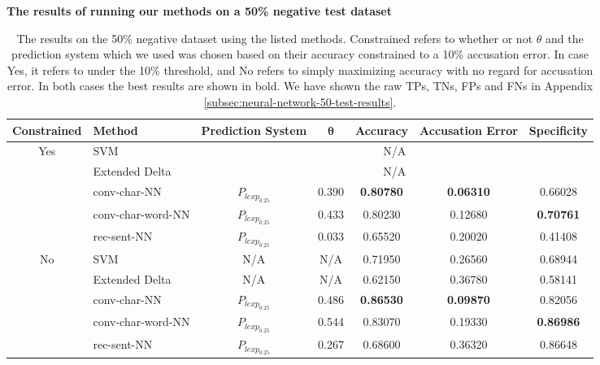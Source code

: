 \begin{table}[]
\centering
\textbf{The results of running our methods on a 50\% negative test dataset}\par\medskip
\begin{adjustbox}{center}
\scriptsize
\begin{tabular}{|c|l|c|c|c|c|c|}
\hline
    \textbf{Constrained} & \textbf{Method} & \textbf{Prediction System} & $\mathbf{\theta}$ & \textbf{Accuracy} & \textbf{Accusation Error} & \textbf{Specificity} \\ \hline
    \multirow{5}{*}{Yes} & \gls{SVM} & \multicolumn{5}{c|}{N/A} \\ \cline{2-7}
    & Extended Delta & \multicolumn{5}{c|}{N/A} \\ \cline{2-7}
    & \gls{conv-char-NN} & $P_{lexp_{0.25}}$ & 0.390 & \textbf{0.80780} & \textbf{0.06310} & 0.66028 \\ \cline{2-7}
    & \gls{conv-char-word-NN} & $P_{lexp_{0.25}}$ & 0.433 & 0.80230 & 0.12680 & \textbf{0.70761} \\ \cline{2-7}
    & \gls{rec-sent-NN} & $P_{lexp_{0.25}}$ & 0.033 & 0.65520 & 0.20020 & 0.41408 \\ \hline\hline
    \multirow{5}{*}{No} & SVM & N/A & N/A & 0.71950 & 0.26560 & 0.68944 \\ \cline{2-7}
    & Extended Delta & N/A & N/A & 0.62150 & 0.36780 & 0.58141 \\ \cline{2-7}
    & \gls{conv-char-NN} & $P_{lexp_{0.25}}$ & 0.486 & \textbf{0.86530} & \textbf{0.09870} & 0.82056 \\ \cline{2-7}
    & \gls{conv-char-word-NN} & $P_{lexp_{0.25}}$ & 0.544 & 0.83070 & 0.19330 & \textbf{0.86986} \\ \cline{2-7}
    & \gls{rec-sent-NN} & $P_{lexp_{0.25}}$ & 0.267 & 0.68600 & 0.36320 & 0.86648 \\ \hline
\end{tabular}
\end{adjustbox}
\caption{The results on the 50\% negative dataset using the listed methods.
Constrained refers to whether or not $\theta$ and the prediction system which we
used was chosen based on their accuracy constrained to a 10\% accusation error.
In case Yes, it refers to under the 10\% threshold, and No refers to simply
maximizing accuracy with no regard for accusation error. In both cases
the best results are shown in bold. We have shown the raw \glspl{TP},
\glspl{TN}, \glspl{FP} and \glspl{FN} in Appendix
\ref{subsec:neural-network-50-test-results}.}
\label{tab:50_results}
\end{table}


